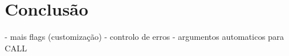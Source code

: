 \chapter{Conclusão}

- mais flags (customização)
- controlo de erros
- argumentos automaticos para CALL